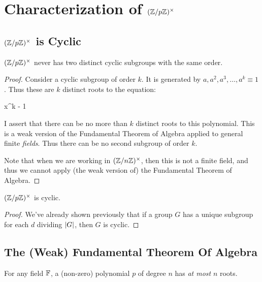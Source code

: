 \section{Characterization of $\mathopen{}\left( {\mathbb{Z} / p\mathbb{Z}} \right)\mathclose{}^\times$}

\subsection{$\mathopen{}\left( {\mathbb{Z} / p\mathbb{Z}} \right)\mathclose{}^\times$ is Cyclic}

\begin{lemma}
  $\mathopen{}\left( {\mathbb{Z} / p\mathbb{Z}} \right)\mathclose{}^\times$ never has two distinct cyclic subgroups with the same order.
\end{lemma}

\begin{proof}
  Consider a cyclic subgroup of order $k$. It is generated by $a, a^2,
  a^3, \ldots, a^k \equiv 1$. Thus these are $k$ distinct roots to the
  equation:

  \begin{nedqn}
    x^k - 1
  \end{nedqn}

  \noindent
  I assert that there can be no more than $k$ distinct roots to this
  polynomial. This is a weak version of the Fundamental Theorem of
  Algebra applied to general finite \emph{fields}. Thus there can be no
  second subgroup of order $k$.

  Note that when we are working in $\mathopen{}\left( {\mathbb{Z} / n\mathbb{Z}} \right)\mathclose{}^\times$, then this is not a finite
  field, and thus we cannot apply (the weak version of) the Fundamental
  Theorem of Algebra.
\end{proof}

\begin{corollary}
  $\mathopen{}\left( {\mathbb{Z} / p\mathbb{Z}} \right)\mathclose{}^\times$ is cyclic.
\end{corollary}

\begin{proof}
  We've already shown previously that if a group $G$ has a unique
  subgroup for each $d$ dividing $|G|$, then $G$ is cyclic.
\end{proof}

\subsection{The (Weak) Fundamental Theorem Of Algebra}

\begin{lemma}
  For any field $\mathbb{F}$, a (non-zero) polynomial $p$ of degree $n$ has
  \emph{at most} $n$ roots.
\end{lemma}

